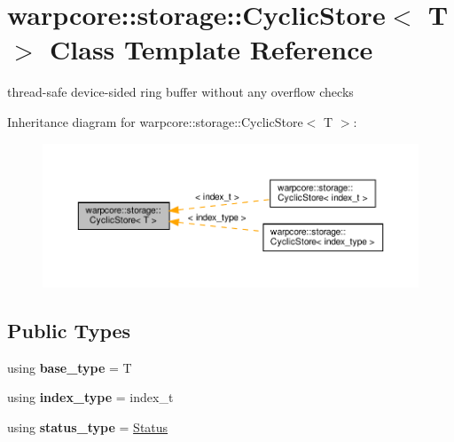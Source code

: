 \hypertarget{classwarpcore_1_1storage_1_1CyclicStore}{}\section{warpcore\+:\+:storage\+:\+:Cyclic\+Store$<$ T $>$ Class Template Reference}
\label{classwarpcore_1_1storage_1_1CyclicStore}


thread-\/safe device-\/sided ring buffer without any overflow checks  




Inheritance diagram for warpcore\+:\+:storage\+:\+:Cyclic\+Store$<$ T $>$\+:
\nopagebreak
\begin{figure}[H]
\begin{center}
\leavevmode
\includegraphics[width=350pt]{classwarpcore_1_1storage_1_1CyclicStore__inherit__graph}
\end{center}
\end{figure}
\subsection*{Public Types}
\begin{DoxyCompactItemize}
\item 
\mbox{\label{classwarpcore_1_1storage_1_1CyclicStore_aab3dd4b7cf7aa2ec39bdd0abf33fc7aa}} 
using {\bfseries base\+\_\+type} = T
\item 
\mbox{\label{classwarpcore_1_1storage_1_1CyclicStore_ad87f57968d5eb91a7fa7eb2ee69738d5}} 
using {\bfseries index\+\_\+type} = index\+\_\+t
\item 
\mbox{\label{classwarpcore_1_1storage_1_1CyclicStore_a83b3e0937acd2dcb0c61297ca142a482}} 
using {\bfseries status\+\_\+type} = \hyperlink{classwarpcore_1_1Status}{Status}
\end{DoxyCompactItemize}
